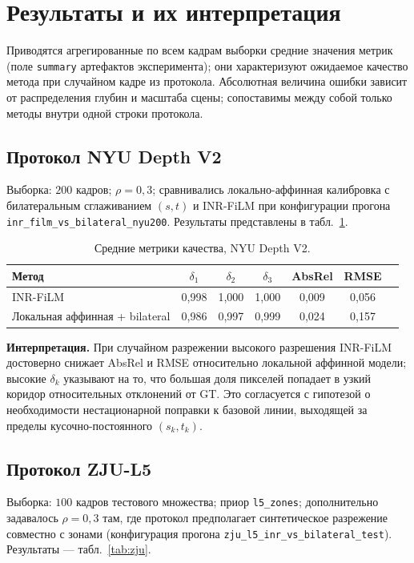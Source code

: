 \documentclass[12pt]{article}
\begin{document}
\section{Результаты и их интерпретация}

Приводятся агрегированные по всем кадрам выборки средние значения метрик (поле \texttt{summary} артефактов эксперимента); они характеризуют ожидаемое качество метода при случайном кадре из протокола. Абсолютная величина ошибки зависит от распределения глубин и масштаба сцены; сопоставимы между собой только методы внутри одной строки протокола.

\subsection{Протокол NYU Depth V2}

Выборка: $200$ кадров; $\rho=0{,}3$; сравнивались локально-аффинная калибровка с билатеральным сглаживанием $(s,t)$ и INR-FiLM при конфигурации прогона \texttt{inr\_film\_vs\_bilateral\_nyu200}. Результаты представлены в табл.~\ref{tab:nyu}.

\begin{table}[h]
  \centering
  \begin{tabular}{lcccccc}
    \toprule
    Метод & $\delta_1$ & $\delta_2$ & $\delta_3$ & AbsRel & RMSE \\
    \midrule
    INR-FiLM & 0{,}998 & 1{,}000 & 1{,}000 & 0{,}009 & 0{,}056 \\
    Локальная аффинная + bilateral & 0{,}986 & 0{,}997 & 0{,}999 & 0{,}024 & 0{,}157 \\
    \bottomrule
  \end{tabular}
  \caption{Средние метрики качества, NYU Depth V2.}
  \label{tab:nyu}
\end{table}

\textbf{Интерпретация.} При случайном разрежении высокого разрешения INR-FiLM достоверно снижает AbsRel и RMSE относительно локальной аффинной модели; высокие $\delta_k$ указывают на то, что большая доля пикселей попадает в узкий коридор относительных отклонений от GT. Это согласуется с гипотезой о необходимости нестационарной поправки к базовой линии, выходящей за пределы кусочно-постоянного $(s_k,t_k)$.

\subsection{Протокол ZJU-L5}

Выборка: $100$ кадров тестового множества; приор \texttt{l5\_zones}; дополнительно задавалось $\rho=0{,}3$ там, где протокол предполагает синтетическое разрежение совместно с зонами (конфигурация прогона \texttt{zju\_l5\_inr\_vs\_bilateral\_test}). Результаты --- табл.~\ref{tab:zju}.
\end{document}
